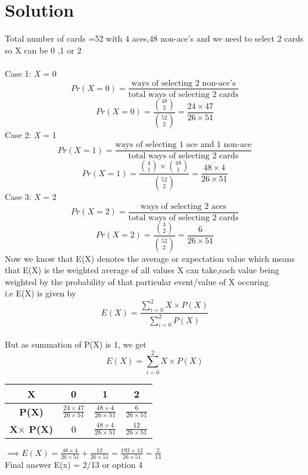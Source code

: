 \documentclass[journal,12pt,twocolumn]{IEEEtran}
\begin{document}
\section{Solution}
Total number of cards =52 with 4 aces,48 non-ace's and we need to select 2 cards
so X can be 0 ,1 or 2\\ \\
Case 1: \emph{X} = 0\\
    \[Pr(X=0) = \frac{\mbox{ways of selecting 2 non-ace's}}{\mbox{total ways of selecting 2 cards}}\]
    \[Pr(X=0) = \frac{{48\choose 2}}{{52\choose2}} = \frac{24\times47}{26\times51}\]
Case 2: \emph{X} = 1\\    
    \[Pr(X=1) = \frac{\mbox{ways of selecting 1 ace and 1 non-ace}}{\mbox{total ways of selecting 2 cards}}\]
    \[Pr(X=1) = \frac{{4\choose1}\times{48\choose1}}{{52\choose2}} = \frac{48\times4}{26\times51}\]
Case 3: \emph{X} = 2\\
    \[Pr(X=2) = \frac{\mbox{ways of selecting 2 aces}}{\mbox{total ways of selecting 2 cards}}\]
    \[Pr(X=2) = \frac{{4 \choose 2}}{{52 \choose 2}} = \frac{6}{26\times51}\] 
 Now we know that E(X) denotes the average or expectation value which means that E(X) is the weighted average of all values X can take,each value being weighted by the probability of that particular event/value of X occuring\\  
 i.e E(X) is given by\[E(X) = \frac{\sum_{i=0}^2 X\times P(X) }{\sum_{i=0}^2 P(X)}\]\\
 But as summation of P(X) is 1,
 we get\[ E(X)=\sum_{i=0}^2 X\times P(X)\]    
\begin{center}
\begin{tabular}{|c|c|c|c|}
\hline
\textbf{X} & 0 & 1 & 2  \\
\hline
\textbf{P(X)} & $\frac {24\times47}{26\times51}$ & $\frac {48\times4}{26\times51}$ & $\frac {6}{26\times51}$ \\
\hline
\textbf{X$\times$ P(X)} & 0 & $\frac {48\times4}{26\times51}$ & $\frac {12}{26\times51}$  \\
\hline 
\end{tabular}
\end{center}
$\implies E(X) = \frac{48\times4}{26\times51} +\frac{12}{26\times51} =\frac{192+12}{26\times51}=\frac{2}{13}$\\

Final answer E(x) = 2/13 or option 4
\end{document}
